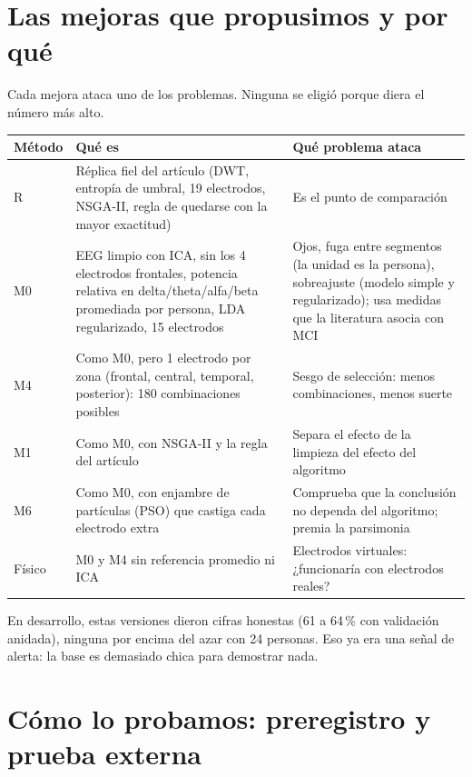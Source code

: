 \documentclass[11pt,letterpaper]{article}
\begin{document}
\section{Las mejoras que propusimos y por qué}

Cada mejora ataca uno de los problemas. Ninguna se eligió porque diera el número más alto.

\begin{center}\small
\begin{tabularx}{\linewidth}{@{}l>{\raggedright\arraybackslash}X>{\raggedright\arraybackslash}X@{}}
\toprule
Método & Qué es & Qué problema ataca \\
\midrule
R & Réplica fiel del artículo (DWT, entropía de umbral, 19 electrodos, NSGA-II, regla de quedarse con la mayor exactitud) & Es el punto de comparación \\
M0 & EEG limpio con ICA, sin los 4 electrodos frontales, potencia relativa en delta/theta/alfa/beta promediada por persona, LDA regularizado, 15 electrodos & Ojos, fuga entre segmentos (la unidad es la persona), sobreajuste (modelo simple y regularizado); usa medidas que la literatura asocia con MCI \\
M4 & Como M0, pero 1 electrodo por zona (frontal, central, temporal, posterior): 180 combinaciones posibles & Sesgo de selección: menos combinaciones, menos suerte \\
M1 & Como M0, con NSGA-II y la regla del artículo & Separa el efecto de la limpieza del efecto del algoritmo \\
M6 & Como M0, con enjambre de partículas (PSO) que castiga cada electrodo extra & Comprueba que la conclusión no dependa del algoritmo; premia la parsimonia \\
Físico & M0 y M4 sin referencia promedio ni ICA & Electrodos virtuales: ¿funcionaría con electrodos reales? \\
\bottomrule
\end{tabularx}
\end{center}

En desarrollo, estas versiones dieron cifras honestas (61 a 64\,\% con validación anidada), ninguna por encima del azar con 24 personas. Eso ya era una señal de alerta: la base es demasiado chica para demostrar nada.

\section{Cómo lo probamos: preregistro y prueba externa}
\end{document}
